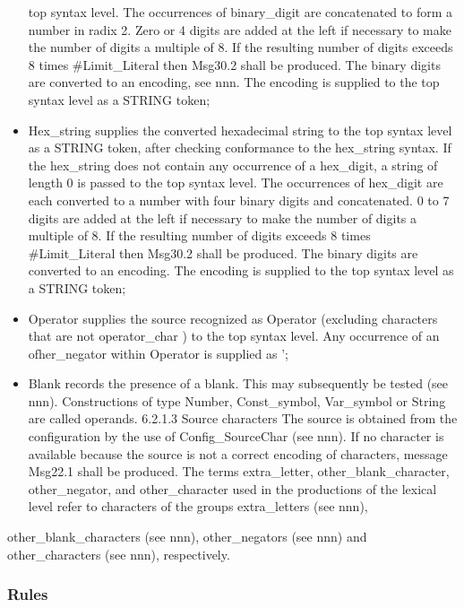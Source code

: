 \begin{itemize}
  top syntax level. The occurrences of binary\_digit are concatenated to
  form a number in radix 2. Zero or 4 digits are added at the left if
  necessary to make the number of digits a multiple of 8. If the
  resulting number of digits exceeds 8 times \#Limit\_Literal then
  Msg30.2 shall be produced. The binary digits are converted to an
  encoding, see nnn. The encoding is supplied to the top syntax level as
  a STRING token;
\item
  Hex\_string supplies the converted hexadecimal string to the top
  syntax level as a STRING token, after checking conformance to the
  hex\_string syntax. If the hex\_string does not contain any occurrence
  of a hex\_digit, a string of length 0 is passed to the top syntax
  level. The occurrences of hex\_digit are each converted to a number
  with four binary digits and concatenated. 0 to 7 digits are added at
  the left if necessary to make the number of digits a multiple of 8. If
  the resulting number of digits exceeds 8 times \#Limit\_Literal then
  Msg30.2 shall be produced. The binary digits are converted to an
  encoding. The encoding is supplied to the top syntax level as a STRING
  token;
\item
  Operator supplies the source recognized as Operator (excluding
  characters that are not operator\_char ) to the top syntax level. Any
  occurrence of an ofher\_negator within Operator is supplied as
  '\textquotesingle;
\item
  Blank records the presence of a blank. This may subsequently be tested
  (see nnn). Constructions of type Number, Const\_symbol, Var\_symbol or
  String are called operands. 6.2.1.3 Source characters The source is
  obtained from the configuration by the use of Config\_SourceChar (see
  nnn). If no character is available because the source is not a correct
  encoding of characters, message Msg22.1 shall be produced. The terms
  extra\_letter, other\_blank\_character, other\_negator, and
  other\_character used in the productions of the lexical level refer to
  characters of the groups extra\_letters (see nnn),
\end{itemize}

other\_blank\_characters (see nnn), other\_negators (see nnn) and
other\_characters (see nnn), respectively.

\hypertarget{rules}{%
\subsubsection{Rules}\label{rules}}

